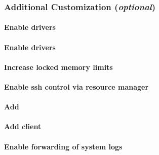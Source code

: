 \documentclass[letterpaper]{article}
\begin{document}
\subsubsection{Additional Customization ({\em optional})} \label{sec:addl_customizations}


\paragraph{Enable \InfiniBand{} drivers}


\paragraph{Enable \OmniPath{} drivers}


\vspace*{0.28cm}
\paragraph{Increase locked memory limits}


\vspace*{-.17cm}
\paragraph{Enable ssh control via resource manager}


\vspace*{-.17cm}
\paragraph{Add \beegfs{}} \label{sec:add_beegfs}


\paragraph{Add \Lustre{} client} \label{sec:lustre_client}




\paragraph{Enable forwarding of system logs} \label{sec:add_syslog}

\end{document}

